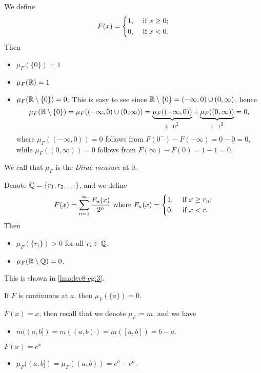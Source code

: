 \begin{eg}
	We define
	\[
		F(x) = \begin{dcases}
			1, & \text{ if } x\geq 0 ; \\
			0, & \text{ if } x<0.
		\end{dcases}
	\]
	Then
	\begin{itemize}
		\item \(\mu _F(\{0\})=1\)
		\item \(\mu _F(\mathbb{\MakeUppercase{r}} ) = 1\)
		\item \(\mu _F(\mathbb{\MakeUppercase{r}}\setminus \{0\} ) = 0\). This is easy to see since \(\mathbb{\MakeUppercase{r}} \setminus \{0\} = (-\infty , 0)\cup (0, \infty )\), hence
		      \[
			      \mu _F(\mathbb{\MakeUppercase{r}} \setminus \{0\}) = \mu _F((-\infty , 0)\cup (0, \infty ))
			      = \underbrace{\mu _F((-\infty , 0))}_{0 - 0\footnotemark } + \underbrace{\mu _F((0, \infty ))}_{1 -1 \footnotemark }= 0,
		      \]
		      where \(\mu _{F} ((-\infty , 0)) = 0\) follows from \(F(0^-) - F(-\infty ) = 0 - 0 = 0\), while
		      \(\mu _{F} ((0, \infty ))=0\) follows from \(F(\infty ) - F(0) = 1 - 1 = 0\).
	\end{itemize}
	We call that \(\mu _F\) is the \emph{Dirac measure} at \(0\).
\end{eg}
\begin{eg}\label{eg:lec8-3}
	Denote \(\mathbb{\MakeUppercase{q}} = \{r_1, r_2, \ldots  \}\), and we define
	\[
		F(x) = \sum\limits_{n=1}^{\infty} \frac{F_n(x)}{2^n} \text{ where }  F_{n}(x) = \begin{dcases}
			1, & \text{ if } x\geq r_n; \\
			0, & \text{ if } x<r.       \\
		\end{dcases}
	\]
	Then
	\begin{itemize}
		\item \(\mu _F(\{r_{i}\})>0\) for all \(r_{i}\in\mathbb{\MakeUppercase{q}} \).
		\item \(\mu _F(\mathbb{\MakeUppercase{r}} \setminus \mathbb{\MakeUppercase{q}} ) = 0\).
	\end{itemize}
	This is shown in \autoref{lma:lec8-eg:3}.
\end{eg}
\begin{eg}
	If \(F\) is continuous at \(a\), then \(\mu _F(\{a\}) = 0\).
\end{eg}
\begin{eg}
	\(F(x) = x\), then recall that we denote \(\mu _F \coloneqq m\), and we have
	\begin{itemize}
		\item \( m((a, b]) = m((a, b)) = m([a, b]) = b - a\).
	\end{itemize}
\end{eg}
\begin{eg}
	\(F(x) = e^x\)
	\begin{itemize}
		\item \(\mu _F((a, b]) = \mu _F((a, b)) = e^b - e^a\).
	\end{itemize}
\end{eg}


